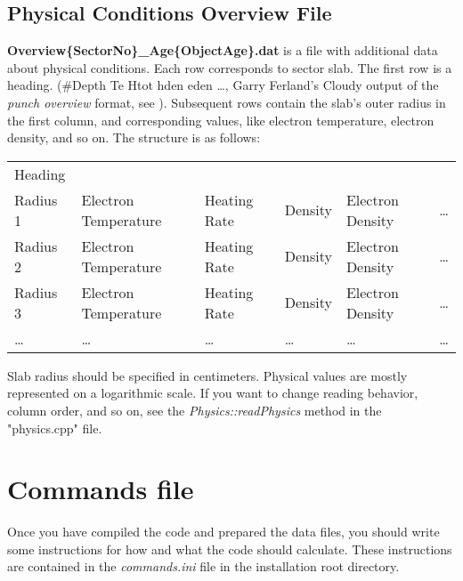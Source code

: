 \documentclass[a4paper]{article}
\begin{document}
\subsection{Physical Conditions Overview File}
\label{dataOverview}
{\bf Overview\{SectorNo\}\_Age\{ObjectAge\}.dat} is a file with additional data about physical conditions. Each row
corresponds to sector slab. The first row is a heading.
(\#Depth Te Htot hden eden \ldots, Garry Ferland's Cloudy output of the {\it punch overview}
format, see \cite{Cloudy}). Subsequent rows contain the slab's outer radius in the first column,
and corresponding values, like electron temperature, electron density, and so on. The structure is as follows:
\begin{table}[H]
    \begin{tabular}{llllll}
        Heading & & & & & \\
        Radius 1 & Electron Temperature & Heating Rate & Density & Electron Density & \ldots \\
        Radius 2 & Electron Temperature & Heating Rate & Density & Electron Density & \ldots \\
        Radius 3 & Electron Temperature & Heating Rate & Density & Electron Density & \ldots \\
        \ldots & \ldots & \ldots & \ldots & \ldots & \ldots \\
    \end{tabular}
\end{table}
Slab radius should be specified in centimeters. Physical values are mostly represented on a logarithmic scale. If you want to change reading behavior, column order, and so on, see the {\it Physics::readPhysics} method in the "physics.cpp" file.

\section{Commands file}

Once you have compiled the code and prepared the data files, you should write some instructions for how and what the code should calculate. These instructions are contained in the {\it commands.ini} file in the installation root directory.
\end{document}
